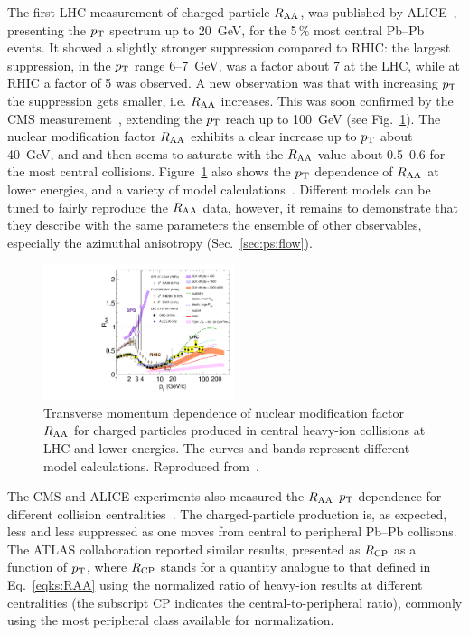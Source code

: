 The first LHC measurement of charged-particle $R_{\rm AA}$, was published by ALICE~\cite{Aamodt:2010jd}, presenting the $p_{\rm T}$ spectrum up to 20~GeV, for the 5\,\% most central Pb--Pb events. It showed a slightly stronger suppression compared to RHIC: the largest suppression, in the $p_{\rm T}$ range 6--7~GeV, was a factor about 7 at the LHC, while at RHIC a factor of 5 was observed. A new observation was that with increasing $p_{\rm T}$ the suppression gets smaller, i.e. $R_{\rm AA}$ increases. This was soon confirmed by the CMS measurement~\cite{CMS:2012aa}, extending the $p_{\rm T}$ reach up to 100~GeV (see Fig.~\ref{figks:CMSRAA}). The nuclear modification factor $R_{\rm AA}$ exhibits a clear increase up to $p_{\rm T}$ about 40~GeV, and and then seems to saturate with the $R_{\rm AA}$ value about 0.5--0.6 for the most central collisions. Figure~\ref{figks:CMSRAA} also shows the $p_{\rm T}$ dependence of $R_{\rm AA}$ at lower energies, and a variety of model calculations~\cite{Dainese:2004te,Vitev:2002pf,Vitev:2004bh,Salgado:2003gb,Armesto:2005iq,Renk:2011gj}. Different models can be tuned to fairly reproduce the $R_{\rm AA}$ data, however, it remains to demonstrate that they describe with the same parameters the ensemble of other observables, especially the azimuthal anisotropy (Sec.~\ref{sec:ps:flow}).

\begin{figure}
\centering
\includegraphics[width=0.5\textwidth]{ksfigures/CMSRAA.pdf}
\caption{Transverse momentum dependence of nuclear modification factor $R_{\rm AA}$ for charged particles produced in central heavy-ion collisions at LHC and lower energies. The curves and bands represent different model calculations. Reproduced from~\cite{CMS:2012aa}.}
\label{figks:CMSRAA}
\end{figure}

The CMS and ALICE experiments also measured the $R_{\rm AA}$ $p_{\rm T}$ dependence for different collision centralities~\cite{CMS:2012aa,Abelev:2012hxa}. The charged-particle production is, as expected, less and less suppressed as one moves from central to peripheral Pb--Pb collisons. The ATLAS collaboration reported similar results, presented as $R_{\rm CP}$ as a function of $p_{\rm T}$, where $R_{\rm CP}$ stands for a quantity analogue  to that defined in Eq.~\ref{eqks:RAA} using the normalized ratio of heavy-ion results at different centralities (the subscript CP indicates the central-to-peripheral ratio), commonly using the most peripheral class available for normalization.
